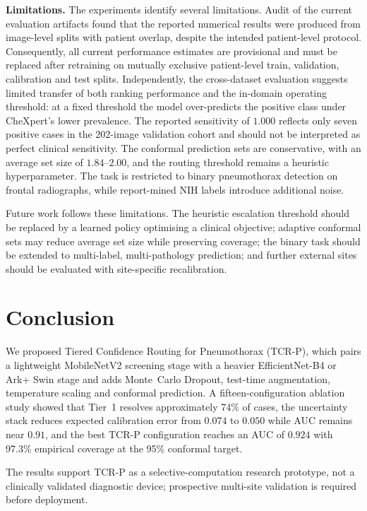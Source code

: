\documentclass[pdflatex,sn-nature]{sn-jnl}
\begin{document}
\textbf{Limitations.} The experiments identify several limitations. Audit of the current evaluation artifacts found that the reported numerical results were produced from image-level splits with patient overlap, despite the intended patient-level protocol. Consequently, all current performance estimates are provisional and must be replaced after retraining on mutually exclusive patient-level train, validation, calibration and test splits. Independently, the cross-dataset evaluation suggests limited transfer of both ranking performance and the in-domain operating threshold: at a fixed threshold the model over-predicts the positive class under CheXpert's lower prevalence. The reported sensitivity of $1.000$ reflects only seven positive cases in the 202-image validation cohort and should not be interpreted as perfect clinical sensitivity. The conformal prediction sets are conservative, with an average set size of $1.84$--$2.00$, and the routing threshold remains a heuristic hyperparameter. The task is restricted to binary pneumothorax detection on frontal radiographs, while report-mined NIH labels introduce additional noise.

Future work follows these limitations. The heuristic escalation threshold should be replaced by a learned policy optimising a clinical objective; adaptive conformal sets may reduce average set size while preserving coverage; the binary task should be extended to multi-label, multi-pathology prediction; and further external sites should be evaluated with site-specific recalibration.

\section{Conclusion}\label{sec:conclusion}

We proposed Tiered Confidence Routing for Pneumothorax (TCR-P), which pairs a lightweight MobileNetV2 screening stage with a heavier EfficientNet-B4 or Ark+ Swin stage and adds Monte~Carlo Dropout, test-time augmentation, temperature scaling and conformal prediction. A fifteen-configuration ablation study showed that Tier~1 resolves approximately 74\% of cases, the uncertainty stack reduces expected calibration error from $0.074$ to $0.050$ while AUC remains near $0.91$, and the best TCR-P configuration reaches an AUC of $0.924$ with 97.3\% empirical coverage at the 95\% conformal target.

The results support TCR-P as a selective-computation research prototype, not a clinically validated diagnostic device; prospective multi-site validation is required before deployment.
\end{document}
